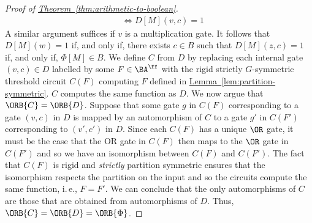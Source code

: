 \documentclass[11pt]{article}
\newcommand{\expref}[2]{\texorpdfstring{\hyperref[#2]{#1~\ref{#2}}}{#1~\ref{#2}}}
\newcommand{\ie}{i.\,e.}
\begin{document}
\begin{proof}[Proof of \expref{Theorem}{thm:arithmetic-to-boolean}]
\begin{align*}
                   &\iff D[M](v, c) = 1 
  \end{align*}
  A similar argument suffices if $v$ is a multiplication gate. It follows that
  $D[M](w) = 1$ if, and only if, there exists $c \in B$ such that $D[M](z, c) =
  1$ if, and only if, $\Phi[M] \in B$.
  We define $C$ from $D$ by replacing each internal gate $(v, c) \in D$ labelled
  by some $F \in \BA^{\ff}$ with the rigid strictly $G$-symmetric threshold
  circuit $C(F)$ computing $F$ defined in \expref{Lemma}{lem:partition-symmetric}.
  $C$ computes the same function as $D$.  We now argue that $\ORB{C}
  = \ORB{D}$.  Suppose that some gate $g$ in $C(F)$ corresponding to a
  gate $(v,c)$ in $D$ is mapped by an automorphism of $C$ to a gate
  $g'$ in $C(F')$ corresponding to $(v',c')$ in $D$.  Since each
  $C(F)$ has a unique $\OR$ gate, it must be the case that the OR gate in
  $C(F)$ then maps to the $\OR$ gate in $C(F')$ and so we have an
  isomorphism between $C(F)$ and $C(F')$.  The fact that  $C(F)$ is
  rigid and  \emph{strictly} partition
  symmetric ensures that the isomorphism respects the partition on the
  input and so the circuits compute the same function, \ie, $F = F'$.
  We can conclude that the only
  automorphisms of $C$ are those that are obtained from automorphisms
  of $D$.  Thus, $\ORB{C} = \ORB{D} = \ORB{\Phi}$.
\end{proof}
      
\end{document}
